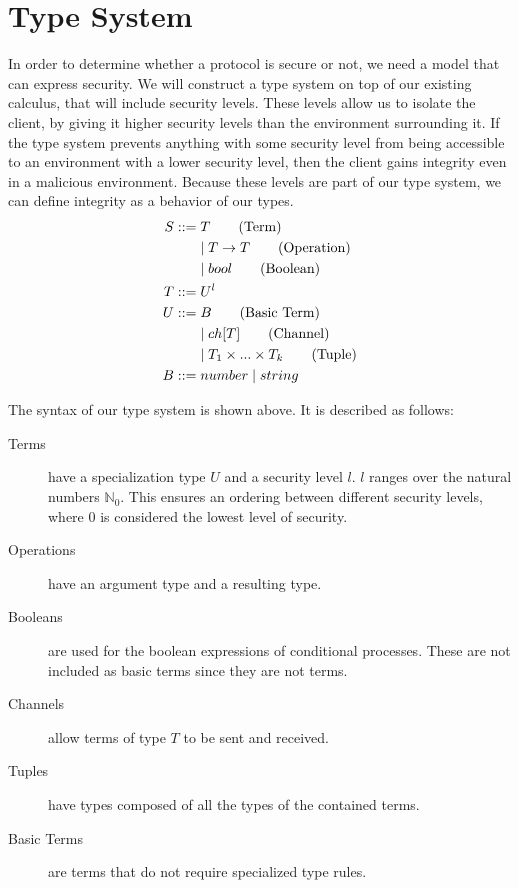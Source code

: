\section{Type System}\label{ch:type-security}
In order to determine whether a protocol is secure or not, we need a model that can express security.
We will construct a type system on top of our existing calculus, that will include security levels.
These levels allow us to isolate the client, by giving it higher security levels than the environment surrounding it.
If the type system prevents anything with some security level from being accessible to an environment with a lower security level, then the client gains integrity even in a malicious environment.
Because these levels are part of our type system, we can define integrity as a behavior of our types.
\begin{align*}
    S::=&\;T \tag{Term}\\
        &\mid T\rightarrow T \tag{Operation}\\
        &\mid bool \tag{Boolean}\\
    T::=&\;U^l\\
    U::=&\;B \tag{Basic Term}\\
        &\mid ch[T] \tag{Channel}\\
        &\mid T_1 \times...\times T_k \tag{Tuple}\\
    B::=&\;number 
        \mid string\\
\end{align*}

\noindent The syntax of our type system is shown above. It is described as follows:

\begin{description}
    \item[Terms] have a specialization type $U$ and a security level $l$.
        $l$ ranges over the natural numbers $\mathbb{N}_0$.
        This ensures an ordering between different security levels, where $0$ is considered the lowest level of security.
    \item[Operations] have an argument type and a resulting type.
    \item[Booleans] are used for the boolean expressions of conditional processes.
        These are not included as basic terms since they are not terms.
    \item[Channels] allow terms of type $T$ to be sent and received.
    \item[Tuples] have types composed of all the types of the contained terms.
    \item[Basic Terms] are terms that do not require specialized type rules.
\end{description}

